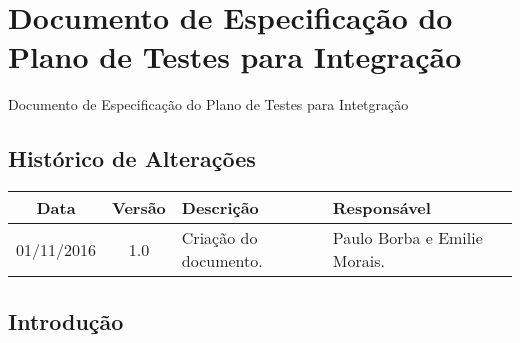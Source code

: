 \chapter{Documento de Especificação do Plano de Testes para Integração} \label{documento_teste}

\begin{center}
 {\large Documento de Especificação do Plano de Testes para Intetgração}\\[0.2cm]
 \end{center}

 \section*{Histórico de Alterações}
\begin{table}[h]
\centering
\begin{tabular}{|c|c|p{6cm}|p{5cm}|}
\hline
Data & Versão & Descrição & Responsável\\
\hline
01/11/2016 & 1.0 & Criação do documento. & Paulo Borba e Emilie Morais.\\
\hline
\end{tabular}
\end{table}

\section*{Introdução}


